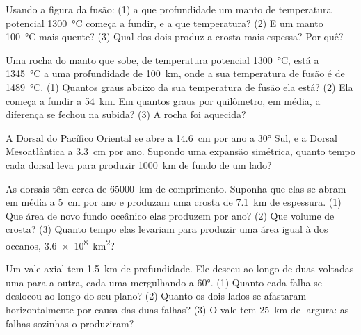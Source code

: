 \begin{exercise}[$\star\star$]\label{exo:g11:ocean-ridges:6}
Usando a figura da fusão: (1) a que profundidade um manto de temperatura
potencial \qty{1300}{\celsius} começa a fundir, e a que temperatura? (2) E
um manto \qty{100}{\celsius} mais quente? (3) Qual dos dois produz a crosta
mais espessa? Por quê?
\end{exercise}

\begin{exercise}[$\star\star$]\label{exo:g11:ocean-ridges:7}
Uma rocha do manto que sobe, de temperatura potencial \qty{1300}{\celsius},
está a \qty{1345}{\celsius} a uma profundidade de \qty{100}{km}, onde a sua
temperatura de fusão é de \qty{1489}{\celsius}. (1) Quantos graus abaixo da
sua temperatura de fusão ela está? (2) Ela começa a fundir a \qty{54}{km}.
Em quantos graus por quilômetro, em média, a diferença se fechou na subida?
(3) A rocha foi aquecida?
\end{exercise}

\begin{exercise}[$\star\star$]\label{exo:g11:ocean-ridges:8}
A Dorsal do Pacífico Oriental se abre a \qty{14.6}{cm} por ano a \ang{30}
Sul, e a Dorsal Mesoatlântica a \qty{3.3}{cm} por ano. Supondo uma expansão
simétrica, quanto tempo cada dorsal leva para produzir \qty{1000}{km} de
fundo de um lado?
\end{exercise}

\begin{exercise}[$\star\star$]\label{exo:g11:ocean-ridges:9}
As dorsais têm cerca de \qty{65000}{km} de comprimento. Suponha que elas se
abram em média a \qty{5}{cm} por ano e produzam uma crosta de \qty{7.1}{km}
de espessura. (1) Que área de novo fundo oceânico elas produzem por ano?
(2) Que volume de crosta? (3) Quanto tempo elas levariam para produzir uma
área igual à dos oceanos, \qty{3.6e8}{km^2}?
\end{exercise}

\begin{exercise}[$\star\star$]\label{exo:g11:ocean-ridges:10}
Um vale axial tem \qty{1.5}{km} de profundidade. Ele desceu ao longo de duas
 voltadas uma para a outra, cada uma mergulhando a \ang{60}.
(1) Quanto cada falha se deslocou ao longo do seu plano? (2) Quanto os dois
lados se afastaram horizontalmente por causa das duas falhas? (3) O vale tem
\qty{25}{km} de largura: as falhas sozinhas o produziram?
\end{exercise}

